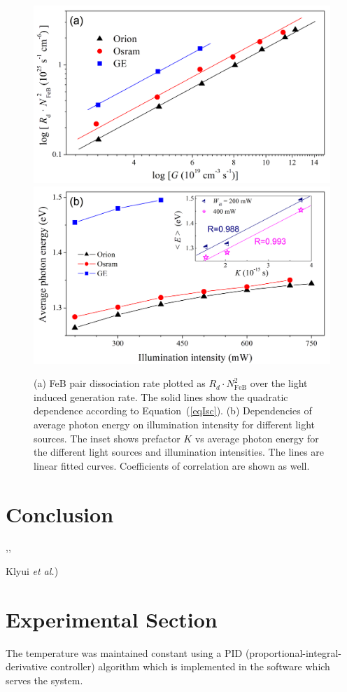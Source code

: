\documentclass{WileyMSP-template}
\begin{document}
\begin{figure}
\centering
  \includegraphics[width=0.4\linewidth]{Fig6a.png}
  \includegraphics[width=0.4\linewidth]{Fig6b.png}
  \caption{
  (a) FeB pair dissociation rate plotted as $R_d\cdot N_\mathrm{FeB}^2$ over the light induced
  generation rate. The solid lines show the quadratic dependence according to Equation~(\ref{eqIsc}).
  (b) Dependencies of average photon energy on illumination intensity for different light sources.
  The inset shows prefactor $K$ vs average photon energy for the different light sources and illumination intensities.
  The lines are linear fitted curves. Coefficients of correlation are shown as well.
  }
  \label{fig6}
\end{figure}



\section{Conclusion}
\cite{KLAASSEN953,ROUGIEUX2018,FeB:kinetic},\cite{Brad2022,AugerSi2022,EBLSHADE}, 

Klyui \emph{et al.}\cite{KostRefl2000})



\section{Experimental Section}

The temperature was maintained constant using a PID (proportional-integral-derivative controller) algorithm which is implemented in the software which serves the system.

\\
\\
\end{document}

